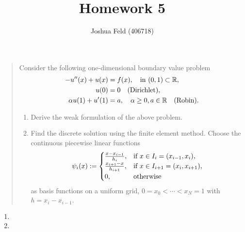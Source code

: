 \documentclass[english]{exercise}
\title{Homework 5}
\author{Joshua Feld (406718)}
\begin{document}
    \maketitle


    \section{}

    \begin{quote}
        Consider the following one-dimensional boundary value problem
        \begin{align*}
            -u''\parentheses*{x} + u\parentheses*{x} &= f\parentheses*{x}, \quad \text{in }\parentheses*{0, 1} \subset \R,\\
            u\parentheses*{0} &= 0 \quad \text{(Dirichlet)},\\
            \alpha u\parentheses*{1} + u'\parentheses*{1} &= a, \quad \alpha \ge 0, a \in \R \quad \text{(Robin)}.
        \end{align*}
        \begin{enumerate}
            \item Derive the weak formulation of the above problem.
            \item Find the discrete solution using the finite element method.
            Choose the continuous piecewise linear functions
            \[
                \psi_i\parentheses*{x} := \begin{cases}
                    \frac{x - x_{i - 1}}{h_i}, & \text{if }x \in I_i = \parentheses*{x_{i - 1}, x_i},\\
                    \frac{x_{i + 1} - x}{h_{i + 1}}, & \text{if }x \in I_{i + 1} = \parentheses*{x_i, x_{i + 1}},\\
                    0, & \text{otherwise}
                \end{cases}
            \]
            as basis functions on a uniform grid, \(0 = x_0 < \cdots < x_N = 1\) with \(h = x_i - x_{i - 1}\).
        \end{enumerate}
    \end{quote}
    
    \begin{enumerate}
        \item
        \item
    \end{enumerate}
    
    
    \section{}
    
\end{document}
